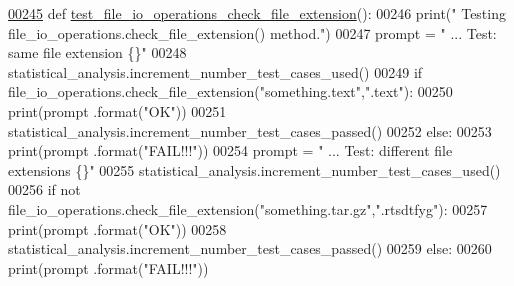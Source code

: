 \begin{DoxyCode}
\hypertarget{classutilities_1_1file__io__tester_1_1file__io__operations__tester_l00245}{}\hyperlink{classutilities_1_1file__io__tester_1_1file__io__operations__tester_aeacc9602a024e8f2b6701b9305ffc930}{00245}     \textcolor{keyword}{def }\hyperlink{classutilities_1_1file__io__tester_1_1file__io__operations__tester_aeacc9602a024e8f2b6701b9305ffc930}{test\_file\_io\_operations\_check\_file\_extension}():
00246         print(\textcolor{stringliteral}{" Testing file\_io\_operations.check\_file\_extension() method."})
00247         prompt = \textcolor{stringliteral}{"  ... Test: same file extension               \{\}"}
00248         statistical\_analysis.increment\_number\_test\_cases\_used()
00249         \textcolor{keywordflow}{if} file\_io\_operations.check\_file\_extension(\textcolor{stringliteral}{"something.text"},\textcolor{stringliteral}{".text"}):
00250             print(prompt .format(\textcolor{stringliteral}{"OK"}))
00251             statistical\_analysis.increment\_number\_test\_cases\_passed()
00252         \textcolor{keywordflow}{else}:
00253             print(prompt .format(\textcolor{stringliteral}{"FAIL!!!"}))
00254         prompt = \textcolor{stringliteral}{"  ... Test: different file extensions         \{\}"}
00255         statistical\_analysis.increment\_number\_test\_cases\_used()
00256         \textcolor{keywordflow}{if} \textcolor{keywordflow}{not} file\_io\_operations.check\_file\_extension(\textcolor{stringliteral}{"something.tar.gz"},\textcolor{stringliteral}{".rtsdtfyg"}):
00257             print(prompt .format(\textcolor{stringliteral}{"OK"}))
00258             statistical\_analysis.increment\_number\_test\_cases\_passed()
00259         \textcolor{keywordflow}{else}:
00260             print(prompt .format(\textcolor{stringliteral}{"FAIL!!!"}))
\end{DoxyCode}
\hypertarget{classutilities_1_1file__io__tester_1_1file__io__operations__tester_a264a387fe5693619617b8b10be1354af}{}
